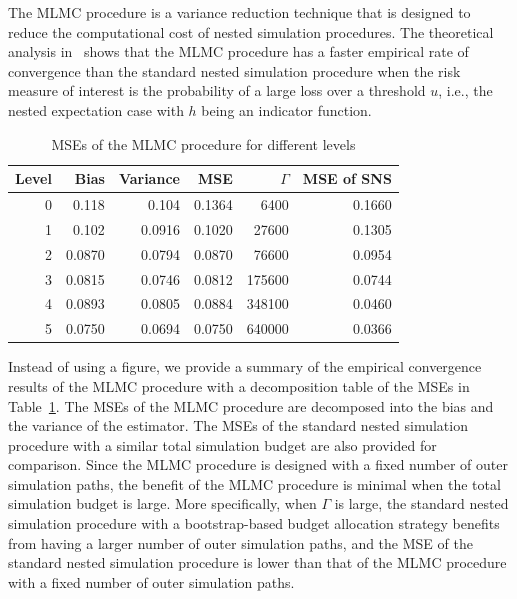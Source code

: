 The MLMC procedure is a variance reduction technique that is designed to reduce the computational cost of nested simulation procedures.
The theoretical analysis in~\cite{giles2019multilevel} shows that the MLMC procedure has a faster empirical rate of convergence than the standard nested simulation procedure when the risk measure of interest is the probability of a large loss over a threshold $u$, i.e., the nested expectation case with $h$ being an indicator function.

\begin{table}[ht]
    \centering
    \begin{tabular}{rrrrrr}
    \toprule
    \textbf{Level} & \textbf{Bias} & \textbf{Variance} & \textbf{MSE} & $\Gamma$ & \textbf{MSE of SNS} \\ 
    \hline\hline
    0 & 0.118  & 0.104  & 0.1364 & 6400     & 0.1660    \\
    1 & 0.102  & 0.0916 & 0.1020 & 27600    & 0.1305    \\
    2 & 0.0870 & 0.0794 & 0.0870 & 76600    & 0.0954    \\
    3 & 0.0815 & 0.0746 & 0.0812 & 175600   & 0.0744    \\
    4 & 0.0893 & 0.0805 & 0.0884 & 348100   & 0.0460    \\
    5 & 0.0750 & 0.0694 & 0.0750 & 640000   & 0.0366    \\
    \bottomrule
    \end{tabular}
    \caption{MSEs of the MLMC procedure for different levels}
    \label{tab1:mlmc-mse}
\end{table}

Instead of using a figure, we provide a summary of the empirical convergence results of the MLMC procedure with a decomposition table of the MSEs in Table~\ref{tab1:mlmc-mse}.
The MSEs of the MLMC procedure are decomposed into the bias and the variance of the estimator.
The MSEs of the standard nested simulation procedure with a similar total simulation budget are also provided for comparison.
Since the MLMC procedure is designed with a fixed number of outer simulation paths, the benefit of the MLMC procedure is minimal when the total simulation budget is large.
More specifically, when $\Gamma$ is large, the standard nested simulation procedure with a bootstrap-based budget allocation strategy benefits from having a larger number of outer simulation paths, and the MSE of the standard nested simulation procedure is lower than that of the MLMC procedure with a fixed number of outer simulation paths.

